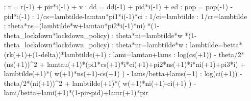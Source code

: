 \documentclass{article}%
\begin{document}
   :  r = r({-}1) + pir*i({-}1) + v\newline%
   :  dd = dd({-}1) + pid*i({-}1) + ed\newline%
   :  pop = pop({-}1) {-} pid*i({-}1)\newline%
   :  1/cs=lambtilde{-}lamtau*pi1*i({-}1)*ci\newline%
   :  1/ci=lambtilde\newline%
   :  1/cr=lambtilde\newline%
   :  theta*ns=(lambtilde*w+lamtau*pi2*i({-}1)*ni) *(1{-}theta\_lockdown*lockdown\_policy)\newline%
   :  theta*ni=lambtilde*w *(1{-}theta\_lockdown*lockdown\_policy)\newline%
   :  theta*nr=lambtilde*w\newline%
   :  lambtilde=betta*(rk(+1)+(1{-}delta))*lambtilde(+1)\newline%
   :  lami=lamtau+lams\newline%
   :  log(cs(+1)) {-} theta/2*(ns(+1))\^{}2 + lamtau(+1)*(pi1*cs(+1)*i*ci(+1)+pi2*ns(+1)*i*ni(+1)+pi3*i) + lambtilde(+1)*( w(+1)*ns(+1){-}cs(+1) ) {-} lams/betta+lams(+1)\newline%
   :  log(ci(+1)) {-} theta/2*(ni(+1))\^{}2 + lambtilde(+1)*( w(+1)*ni(+1){-}ci(+1) ) {-} lami/betta+lami(+1)*(1{-}pir{-}pid)+lamr(+1)*pir\newline%
\end{document}
